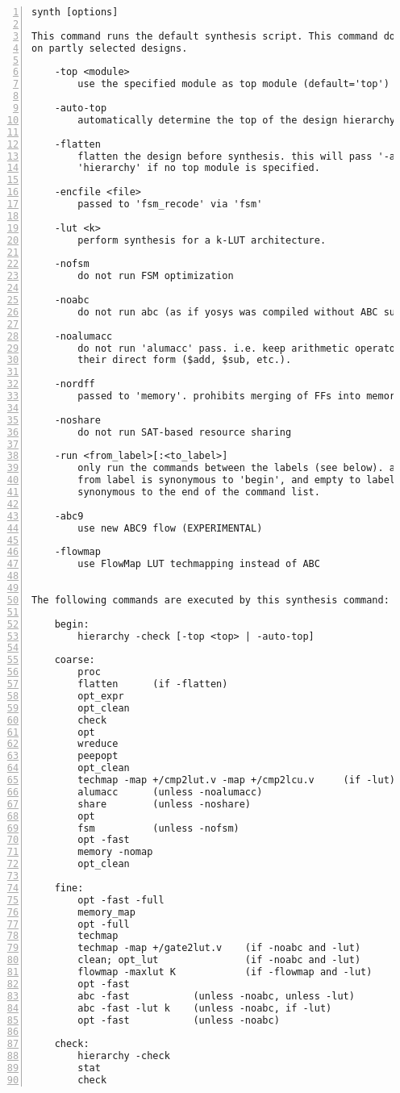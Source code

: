 \begin{lstlisting}[numbers=left,frame=single]
    synth [options]

This command runs the default synthesis script. This command does not operate
on partly selected designs.

    -top <module>
        use the specified module as top module (default='top')

    -auto-top
        automatically determine the top of the design hierarchy

    -flatten
        flatten the design before synthesis. this will pass '-auto-top' to
        'hierarchy' if no top module is specified.

    -encfile <file>
        passed to 'fsm_recode' via 'fsm'

    -lut <k>
        perform synthesis for a k-LUT architecture.

    -nofsm
        do not run FSM optimization

    -noabc
        do not run abc (as if yosys was compiled without ABC support)

    -noalumacc
        do not run 'alumacc' pass. i.e. keep arithmetic operators in
        their direct form ($add, $sub, etc.).

    -nordff
        passed to 'memory'. prohibits merging of FFs into memory read ports

    -noshare
        do not run SAT-based resource sharing

    -run <from_label>[:<to_label>]
        only run the commands between the labels (see below). an empty
        from label is synonymous to 'begin', and empty to label is
        synonymous to the end of the command list.

    -abc9
        use new ABC9 flow (EXPERIMENTAL)

    -flowmap
        use FlowMap LUT techmapping instead of ABC


The following commands are executed by this synthesis command:

    begin:
        hierarchy -check [-top <top> | -auto-top]

    coarse:
        proc
        flatten      (if -flatten)
        opt_expr
        opt_clean
        check
        opt
        wreduce
        peepopt
        opt_clean
        techmap -map +/cmp2lut.v -map +/cmp2lcu.v     (if -lut)
        alumacc      (unless -noalumacc)
        share        (unless -noshare)
        opt
        fsm          (unless -nofsm)
        opt -fast
        memory -nomap
        opt_clean

    fine:
        opt -fast -full
        memory_map
        opt -full
        techmap
        techmap -map +/gate2lut.v    (if -noabc and -lut)
        clean; opt_lut               (if -noabc and -lut)
        flowmap -maxlut K            (if -flowmap and -lut)
        opt -fast
        abc -fast           (unless -noabc, unless -lut)
        abc -fast -lut k    (unless -noabc, if -lut)
        opt -fast           (unless -noabc)

    check:
        hierarchy -check
        stat
        check
\end{lstlisting}

